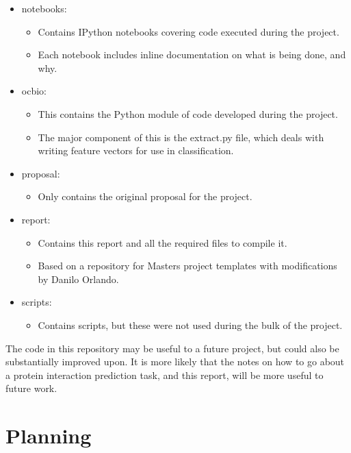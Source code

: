 \begin{itemize}
    \item notebooks:
        \begin{itemize}
            \item Contains IPython notebooks covering code executed during the project.
            \item Each notebook includes inline documentation on what is being done, and why.
        \end{itemize}
    \item ocbio:
        \begin{itemize}
            \item This contains the Python module of code developed during the project.
            \item The major component of this is the extract.py file, which deals with writing feature vectors for use in classification.
        \end{itemize}
    \item proposal:
        \begin{itemize}
            \item Only contains the original proposal for the project.
        \end{itemize}
    \item report:
        \begin{itemize}
            \item Contains this report and all the required files to compile it.
            \item Based on a repository for Masters project templates\autocite{ug4template} with modifications by Danilo Orlando.
        \end{itemize}
    \item scripts:
        \begin{itemize}
            \item Contains scripts, but these were not used during the bulk of the project.
        \end{itemize}
\end{itemize}

The code in this repository may be useful to a future project, but could also be substantially improved upon.
It is more likely that the notes on how to go about a protein interaction prediction task, and this report, will be more useful to future work.

\section{Planning}


